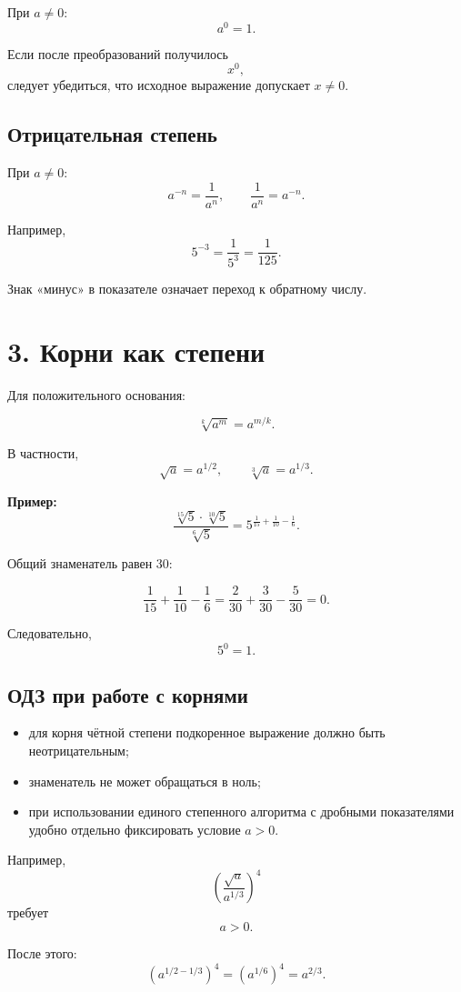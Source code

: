 \documentclass[a4paper,12pt]{article}
\begin{document}
При \(a\neq0\):
\[
a^0=1.
\]

Если после преобразований получилось
\[
x^0,
\]
следует убедиться, что исходное выражение допускает \(x\neq0\).

\subsection{Отрицательная степень}

При \(a\neq0\):
\[
a^{-n}=\frac1{a^n},
\qquad
\frac1{a^n}=a^{-n}.
\]

Например,
\[
5^{-3}
=
\frac1{5^3}
=
\frac1{125}.
\]

Знак «минус» в показателе означает переход к обратному числу.

\section{3. Корни как степени}

Для положительного основания:

\[
\sqrt[k]{a^m}=a^{m/k}.
\]

В частности,
\[
\sqrt a=a^{1/2},
\qquad
\sqrt[3]{a}=a^{1/3}.
\]

\textbf{Пример:}
\[
\frac{\sqrt[15]{5}\cdot\sqrt[10]{5}}
     {\sqrt[6]{5}}
=
5^{\frac1{15}+\frac1{10}-\frac16}.
\]

Общий знаменатель равен \(30\):

\[
\frac1{15}+\frac1{10}-\frac16
=
\frac2{30}+\frac3{30}-\frac5{30}
=
0.
\]

Следовательно,
\[
5^0=1.
\]

\subsection{ОДЗ при работе с корнями}

\begin{itemize}
  \item для корня чётной степени подкоренное выражение должно быть неотрицательным;
  \item знаменатель не может обращаться в ноль;
  \item при использовании единого степенного алгоритма с дробными показателями удобно отдельно фиксировать условие \(a>0\).
\end{itemize}

Например,
\[
\left(\frac{\sqrt a}{a^{1/3}}\right)^4
\]
требует
\[
a>0.
\]

После этого:
\[
\left(
a^{1/2-1/3}
\right)^4
=
\left(a^{1/6}\right)^4
=
a^{2/3}.
\]
\end{document}
